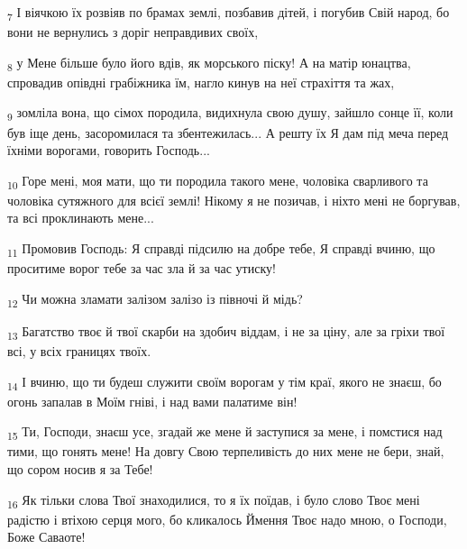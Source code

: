 \begin{tcolorbox}
\textsubscript{7} І віячкою їх розвіяв по брамах землі, позбавив дітей, і погубив Свій народ, бо вони не вернулись з доріг неправдивих своїх,
\end{tcolorbox}
\begin{tcolorbox}
\textsubscript{8} у Мене більше було його вдів, як морського піску! А на матір юнацтва, спровадив опівдні грабіжника їм, нагло кинув на неї страхіття та жах,
\end{tcolorbox}
\begin{tcolorbox}
\textsubscript{9} зомліла вона, що сімох породила, видихнула свою душу, зайшло сонце її, коли був іще день, засоромилася та збентежилась... А решту їх Я дам під меча перед їхніми ворогами, говорить Господь...
\end{tcolorbox}
\begin{tcolorbox}
\textsubscript{10} Горе мені, моя мати, що ти породила такого мене, чоловіка сварливого та чоловіка сутяжного для всієї землі! Нікому я не позичав, і ніхто мені не боргував, та всі проклинають мене...
\end{tcolorbox}
\begin{tcolorbox}
\textsubscript{11} Промовив Господь: Я справді підсилю на добре тебе, Я справді вчиню, що проситиме ворог тебе за час зла й за час утиску!
\end{tcolorbox}
\begin{tcolorbox}
\textsubscript{12} Чи можна зламати залізом залізо із півночі й мідь?
\end{tcolorbox}
\begin{tcolorbox}
\textsubscript{13} Багатство твоє й твої скарби на здобич віддам, і не за ціну, але за гріхи твої всі, у всіх границях твоїх.
\end{tcolorbox}
\begin{tcolorbox}
\textsubscript{14} І вчиню, що ти будеш служити своїм ворогам у тім краї, якого не знаєш, бо огонь запалав в Моїм гніві, і над вами палатиме він!
\end{tcolorbox}
\begin{tcolorbox}
\textsubscript{15} Ти, Господи, знаєш усе, згадай же мене й заступися за мене, і помстися над тими, що гонять мене! На довгу Свою терпеливість до них мене не бери, знай, що сором носив я за Тебе!
\end{tcolorbox}
\begin{tcolorbox}
\textsubscript{16} Як тільки слова Твої знаходилися, то я їх поїдав, і було слово Твоє мені радістю і втіхою серця мого, бо кликалось Ймення Твоє надо мною, о Господи, Боже Саваоте!
\end{tcolorbox}
